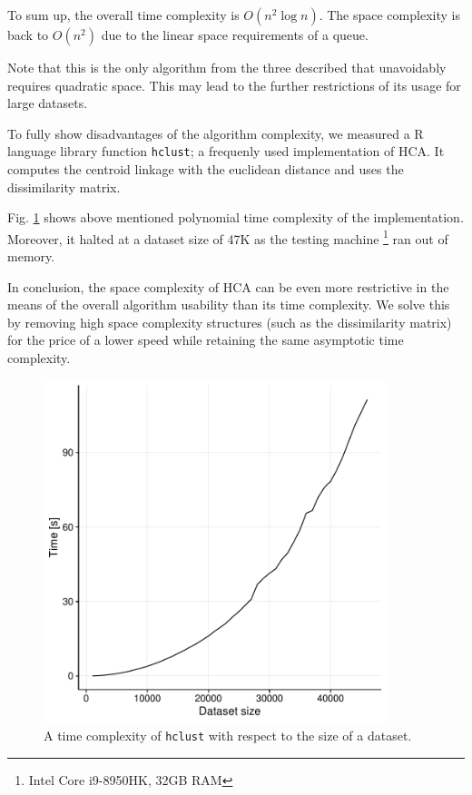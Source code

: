 \begin{description}
 	To sum up, the overall time complexity is $O(n^2\log{n})$. The space complexity is back to $O(n^2)$ due to the linear space requirements of a queue.
 	
 	\begin{rem}
 		Note that this is the only algorithm from the three described that unavoidably requires quadratic space. This may lead to the further restrictions of its usage for large datasets.
 	\end{rem}

\end{description}

To fully show disadvantages of the algorithm complexity, we measured a R language library function \texttt{hclust}; a frequenly used implementation of HCA. It computes the centroid linkage with the euclidean distance and uses the dissimilarity matrix. 

Fig. \ref{fig01:hclust} shows above mentioned polynomial time complexity of the implementation. Moreover, it halted at a dataset size of 47K as the testing machine \footnote{Intel Core i9-8950HK, 32GB RAM} ran out of memory.

In conclusion, the space complexity of HCA can be even more restrictive in the means of the overall algorithm usability than its time complexity. We solve this by removing high space complexity structures (such as the dissimilarity matrix) for the price of a lower speed while retaining the same asymptotic time complexity.

\begin{figure}\centering
	\includegraphics[width=10cm]{img/hclust}
	\caption{A time complexity of \texttt{hclust} with respect to the size of a dataset.}
	\label{fig01:hclust}
\end{figure}
